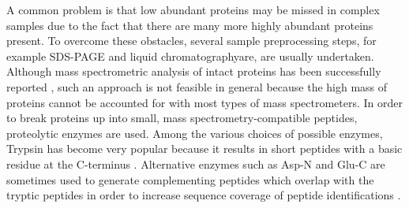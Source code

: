 

A common problem is that low abundant proteins may be missed in complex samples 
due to the fact that there are many more highly abundant proteins present.
To overcome these obstacles, several sample preprocessing steps, for example 
SDS-PAGE and liquid chromatographyare, are usually undertaken.
Although mass spectrometric analysis of intact proteins has been successfully
reported \citep{Lee2002, Taylor2003}, such an approach is not feasible in 
general because the high mass of proteins cannot be accounted for with most
types of mass spectrometers.
In order to break proteins up into small, mass spectrometry-compatible peptides, 
proteolytic enzymes are used.
Among the various choices of possible enzymes, Trypsin has become very popular
because it results in short peptides with a basic residue at the C-terminus
\citep{Olsen2004}.
Alternative enzymes such as Asp-N and Glu-C are sometimes used to generate
complementing peptides which overlap with the tryptic peptides in order to 
increase sequence coverage of peptide identifications \citep{Steen2004}.

% 

